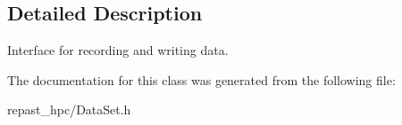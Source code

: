\subsection{Detailed Description}
Interface for recording and writing data. 

The documentation for this class was generated from the following file\-:\begin{DoxyCompactItemize}
\item 
repast\-\_\-hpc/Data\-Set.\-h\end{DoxyCompactItemize}
